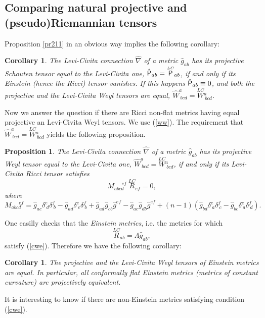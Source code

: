 \documentclass[letterpaper]{amsart}
\newtheorem{proposition}[theorem]{Proposition}
\newtheorem{corollary}[theorem]{Corollary}
\theoremstyle{definition}
\theoremstyle{remark}
\newcommand{\be}{\begin{equation}}
\newcommand{\ee}{\end{equation}}
\newcommand{\weyl}{{\stackrel{\scriptscriptstyle{LC}}{W}}\phantom{}}
\newcommand{\schou}{{\stackrel{\scriptscriptstyle{LC}}{\Rho}}}
\newcommand{\rlc}{{\stackrel{\scriptscriptstyle{LC}}{R}}}
\newcommand{\Rho}{{\mbox{\sf P}}}
\begin{document}
\subsection{Comparing natural projective and (pseudo)Riemannian tensors}
Proposition \ref{pr211} in an obvious way implies the following
corollary:
\begin{corollary}
The Levi-Civita connection $\hat{\nabla}$ of a metric $\hat{g}_{ab}$
has its projective Schouten tensor equal to the Levi-Civita one,
$\hat{\Rho}_{ab}=\schou_{ab}$, if and only if its Einstein (hence the
Ricci) tensor vanishes. If this happens $\hat{\Rho}_{ab}\equiv 0$, and
both the projective and the Levi-Civita Weyl tensors are equal,
$\hat{W}^a_{~bcd}=\weyl^a_{~bcd}$. 
\end{corollary} 
Now we answer the question if there are Ricci non-flat metrics having
equal projective an Levi-Civita Weyl tensors. We use (\ref{ww}). The
requirement that $\hat{W}^a_{~bcd}=\weyl^a_{~bcd}$ yields the
following proposition.
\begin{proposition}
The Levi-Civita connection $\hat{\nabla}$ of a metric $\hat{g}_{ab}$
has its projective Weyl tensor equal to the Levi-Civita one,
$\hat{W}^a_{~bcd}=\weyl^a_{~bcd}$, if and only if its Levi-Civita Ricci
tensor satisfies
\be M_{abcd}^{\quad\,\,\,ef}~\rlc_{ef}=0,\label{cwe}\ee
where
$$M_{abcd}^{\quad\,\,\,ef}=\hat{g}_{ac}\delta^e_{~d}\delta^f_{~b}-\hat{g}_{ad}\delta^e_{~c}\delta^f_{~b}+\hat{g}_{ad}\hat{g}_{cb}\hat{g}^{ef}-\hat{g}_{ac}\hat{g}_{db}\hat{g}^{ef}+(n-1)(\hat{g}_{bd}\delta^e_{~a}\delta^f_{~c}-\hat{g}_{bc}\delta^e_{~a}\delta^f_{~d}).$$
\end{proposition} 
One easilly checks that the \emph{Einstein metrics}, i.e. the metrics for which 
$$\rlc_{ab}=\Lambda \hat{g}_{ab},$$ satisfy
(\ref{cwe}). Therefore we have the following corollary:
\begin{corollary}\label{wni}
The projective and the Levi-Civita Weyl tensors of \emph{Einstein}
metrics are equal. In particular, all conformally flat Einstein
metrics (metrics of constant curvature) are projectively equivalent.  
\end{corollary}
It is interesting to know if there are non-Einstein metrics satisfying
condition (\ref{cwe}). 
\end{document}
